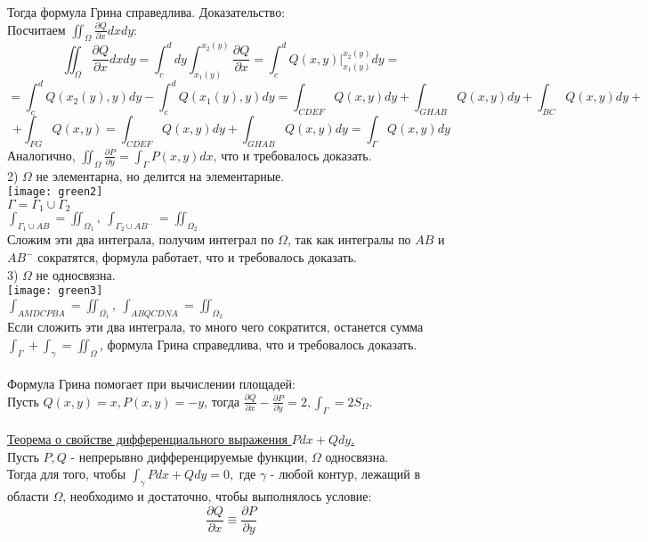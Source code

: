 \documentclass[12pt]{article}
\begin{document}
Тогда формула Грина справедлива. Доказательство:\\
Посчитаем $\iint_\Omega \frac{\partial Q}{\partial x} dxdy$:\\
$$\iint_\Omega \frac{\partial Q}{\partial x} dxdy = \int_c^d dy \int_{x_1(y)}^{x_2(y)} \frac{\partial Q}{\partial x}=\int_c^d Q(x,y) |_{x_1(y)}^{x_2(y)} dy=$$
$$= \int_c^d Q(x_2(y),y)dy - \int_c^d Q(x_1(y),y)dy = \int_{CDEF} Q(x,y)dy + \int_{GHAB} Q(x,y) dy + \int_{BC} Q(x,y)dy +$$
$$+\int_{FG} Q(x,y)=\int_{CDEF} Q(x,y)dy + \int_{GHAB} Q(x,y) dy=\int_\Gamma Q(x,y)dy$$
Аналогично, $\iint_\Omega \frac{\partial P}{\partial y}=\int_\Gamma P(x,y)dx$, что и требовалось доказать.\\
2) $\Omega$ не элементарна, но делится на элементарные.\\
\texttt{[image: green2]}\\
$\Gamma = \Gamma_1 \cup \Gamma_2$\\
$\int_{\Gamma_1 \cup AB} = \iint_{\Omega_1}, \ \int_{\Gamma_2 \cup AB^{-}} = \iint_{\Omega_2}$\\
Сложим эти два интеграла, получим интеграл по $\Omega$, так как интегралы по $AB$ и $AB^{-}$ сократятся, формула работает, что и требовалось доказать.\\
3) $\Omega$ не односвязна.\\
\texttt{[image: green3]}\\
$\int_{AMDCPBA} = \iint_{\Omega_1}, \ \int_{ABQCDNA} = \iint_{\Omega_2}$\\
Если сложить эти два интеграла, то много чего сократится, останется сумма $\int_\Gamma + \int_\gamma = \iint_\Omega$, формула Грина справедлива, что и требовалось доказать.\\
\\
Формула Грина помогает при вычислении площадей:\\
Пусть $Q(x,y) = x, P(x,y) = -y$, тогда $\frac{\partial Q}{\partial x} - \frac{\partial P}{\partial y} = 2, \int_\Gamma = 2S_{\Omega}$.\\
\\
\label{question29_2}\uline{Теорема о свойстве дифференциального выражения $Pdx + Qdy$.}\\
Пусть $P, Q$ - непрерывно дифференцируемые функции, $\Omega$ односвязна.\\
Тогда для того, чтобы $\int_\gamma Pdx+Qdy =0,$ где $\gamma$ - любой контур, лежащий в области $\Omega$, необходимо и достаточно, чтобы выполнялось условие:\\
$$\frac{\partial Q}{\partial x} \equiv \frac{\partial P}{\partial y}$$
\end{document}
